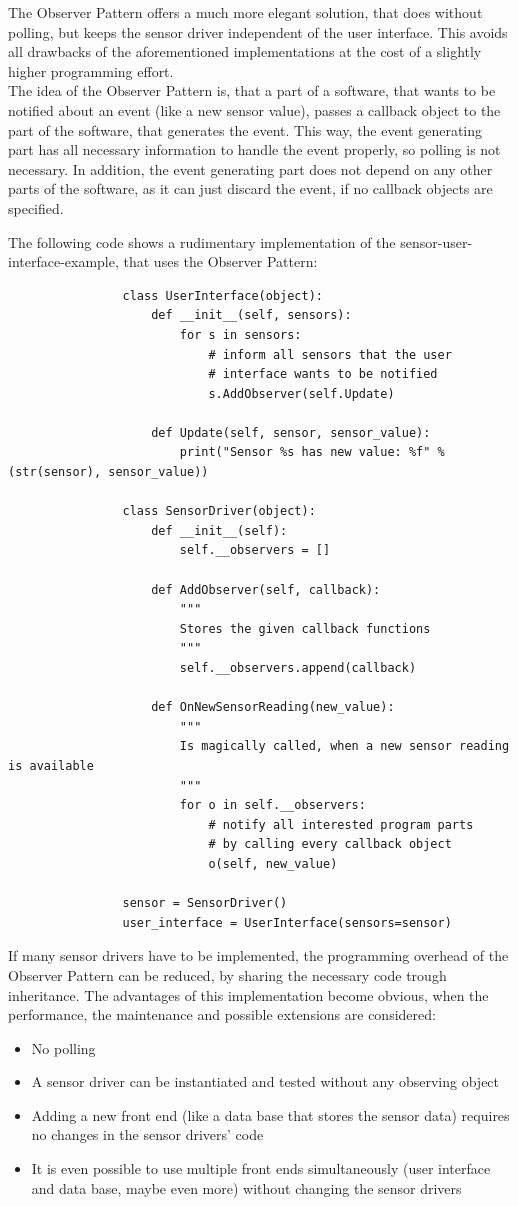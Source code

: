 			The Observer Pattern offers a much more elegant solution, that does without polling, but keeps the sensor driver independent of the user interface.
			This avoids all drawbacks of the aforementioned implementations at the cost of a slightly higher programming effort.\\
			The idea of the Observer Pattern is, that a part of a software, that wants to be notified about an event (like a new sensor value), passes a callback object to the part of the software, that generates the event.
			This way, the event generating part has all necessary information to handle the event properly, so polling is not necessary.
			In addition, the event generating part does not depend on any other parts of the software, as it can just discard the event, if no callback objects are specified.

			The following code shows a rudimentary implementation of the sensor-user-interface-example, that uses the Observer Pattern:
			\begin{verbatim}
				class UserInterface(object):
					def __init__(self, sensors):
						for s in sensors:
							# inform all sensors that the user
							# interface wants to be notified
							s.AddObserver(self.Update)

					def Update(self, sensor, sensor_value):
						print("Sensor %s has new value: %f" % (str(sensor), sensor_value))

				class SensorDriver(object):
					def __init__(self):
						self.__observers = []
				
					def AddObserver(self, callback):
						"""
						Stores the given callback functions
						"""
						self.__observers.append(callback)

					def OnNewSensorReading(new_value):
						"""
						Is magically called, when a new sensor reading is available
						"""
						for o in self.__observers:
							# notify all interested program parts
							# by calling every callback object
							o(self, new_value)

				sensor = SensorDriver()
				user_interface = UserInterface(sensors=sensor)
			\end{verbatim}
			If many sensor drivers have to be implemented, the programming overhead of the Observer Pattern can be reduced, by sharing the necessary code trough inheritance.
			The advantages of this implementation become obvious, when the performance, the maintenance and possible extensions are considered:
			\begin{itemize}
				\item No polling
				\item A sensor driver can be instantiated and tested without any observing object
				\item Adding a new front end (like a data base that stores the sensor data) requires no changes in the sensor drivers' code
				\item It is even possible to use multiple front ends simultaneously (user interface and data base, maybe even more) without changing the sensor drivers
			\end{itemize}


